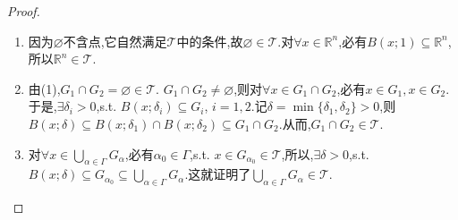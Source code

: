 \documentclass[../../main.tex]{subfiles}%
\begin{document}
\begin{proof}
\begin{enumerate}[(1)]
\item 因为$\varnothing$不含点,它自然满足$\mathscr{T}$中的条件,故$\varnothing\in\mathscr{T}$.对$\forall x\in\mathbb{R}^n$,必有$B(x;1)\subseteq\mathbb{R}^n$,所以$\mathbb{R}^n\in\mathscr{T}$.

\item \one 由(1),$G_1\cap G_2=\varnothing\in\mathscr{T}$.
\two $G_1\cap G_2\neq\varnothing$,则对$\forall x\in G_1\cap G_2$,必有$x\in G_1,x\in G_2$.于是,$\exists\delta_i>0$,s.t. $B(x;\delta_i)\subseteq G_i$, $i=1,2$.记$\delta=\min\{\delta_1,\delta_2\}>0$,则$B(x;\delta)\subseteq B(x;\delta_1)\cap B(x;\delta_2)\subseteq G_1\cap G_2$.从而,$G_1\cap G_2\in\mathscr{T}$.

\item 对$\forall x\in\bigcup_{\alpha\in\Gamma}G_\alpha$,必有$\alpha_0\in\Gamma$,s.t. $x\in G_{\alpha_0}\in\mathscr{T}$,所以,$\exists\delta>0$,s.t. $B(x;\delta)\subseteq G_{\alpha_0}\subseteq\bigcup_{\alpha\in\Gamma}G_\alpha$.这就证明了$\bigcup_{\alpha\in\Gamma}G_\alpha\in\mathscr{T}$.
\end{enumerate}

\end{proof}
\end{document}
